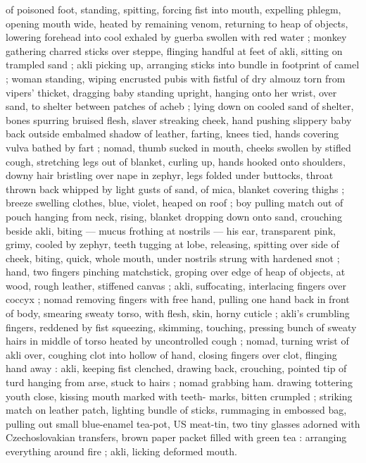 of poisoned foot, standing, spitting, forcing fist into mouth, expelling 
phlegm, opening mouth wide, heated by remaining venom, returning 
to heap of objects, lowering forehead into cool exhaled by guerba 
swollen with red water ; monkey gathering charred sticks over 
steppe, flinging handful at feet of akli, sitting on trampled sand ; akli 
picking up, arranging sticks into bundle in footprint of camel ; woman 
standing, wiping encrusted pubis with fistful of dry almouz torn from 
vipers' thicket, dragging baby standing upright, hanging onto her 
wrist, over sand, to shelter between patches of acheb ; lying down on 
cooled sand of shelter, bones spurring bruised flesh, slaver 
streaking cheek, hand pushing slippery baby back outside embalmed 
shadow of leather, farting, knees tied, hands covering vulva bathed 
by fart ; nomad, thumb sucked in mouth, cheeks swollen by stifled 
cough, stretching legs out of blanket, curling up, hands hooked onto 
shoulders, downy hair bristling over nape in zephyr, legs folded 
under buttocks, throat thrown back whipped by light gusts of sand, 
of mica, blanket covering thighs ; breeze swelling clothes, blue, 
violet, heaped on roof ; boy pulling match out of pouch hanging from 
neck, rising, blanket dropping down onto sand, crouching beside akli, 
biting --- mucus frothing at nostrils --- his ear, transparent pink, 
grimy, cooled by zephyr, teeth tugging at lobe, releasing, spitting 
over side of cheek, biting, quick, whole mouth, under nostrils strung 
with hardened snot ; hand, two fingers pinching matchstick, groping 
over edge of heap of objects, at wood, rough leather, stiffened 
canvas ; akli, suffocating, interlacing fingers over coccyx ; nomad 
removing fingers with free hand, pulling one hand back in front of 
body, smearing sweaty torso, with flesh, skin, horny cuticle ; akli's 
crumbling fingers, reddened by fist squeezing, skimming, touching, 
pressing bunch of sweaty hairs in middle of torso heated by 
uncontrolled cough ; nomad, turning wrist of akli over, coughing clot 
into hollow of hand, closing fingers over clot, flinging hand away : 
akli, keeping fist clenched, drawing back, crouching, pointed tip of 
turd hanging from arse, stuck to hairs ; nomad grabbing ham. 
drawing tottering youth close, kissing mouth marked with teeth- 
marks, bitten crumpled ; striking match on leather patch, lighting 
bundle of sticks, rummaging in embossed bag, pulling out small 
blue-enamel tea-pot, US meat-tin, two tiny glasses adorned with 
Czechoslovakian transfers, brown paper packet filled with green tea 
: arranging everything around fire ; akli, licking deformed mouth. 
